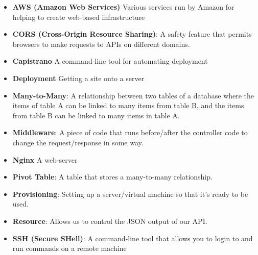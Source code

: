 \begin{itemize}[leftmargin=*]
    \item
        \textbf{AWS (Amazon Web Services)}
        Various services run by Amazon for helping to create web-based infrastructure
    \item
        \textbf{CORS (Cross-Origin Resource Sharing)}:
        A safety feature that permits browsers to make requests to APIs on different domains.
    \item
        \textbf{Capistrano}
        A command-line tool for automating deployment
    \item
        \textbf{Deployment}
        Getting a site onto a server
    \item
        \textbf{Many-to-Many}:
        A relationship between two tables of a database where the items of table A can be linked to many items from table B, and the items from table B can be linked to many items in table A.
    \item
        \textbf{Middleware}:
        A piece of code that runs before/after the controller code to change the request/response in some way.
    \item
        \textbf{Nginx}
        A web-server
    \item
        \textbf{Pivot Table}:
        A table that stores a many-to-many relationship.
    \item
        \textbf{Provisioning}:
        Setting up a server/virtual machine so that it's ready to be used.
    \item
        \textbf{Resource}:
        Allows us to control the JSON output of our API.
    \item
        \textbf{SSH (Secure SHell)}:
        A command-line tool that allows you to login to and run commands on a remote machine
\end{itemize}
